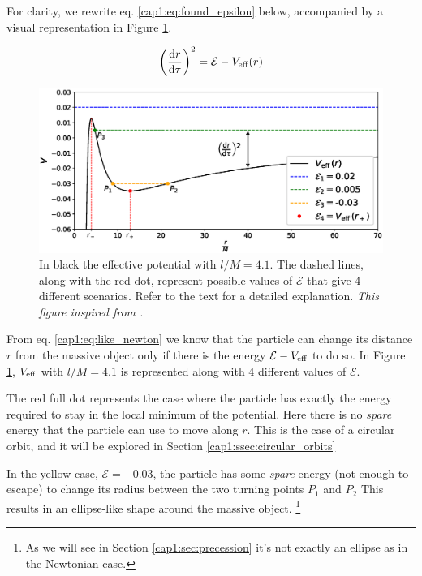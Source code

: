 For clarity, we rewrite eq. \ref{cap1:eq:found_epsilon} below, accompanied by a
visual representation in Figure \ref{cap1:fig:V_eff_orbits}.

\begin{equation}
    \left( \dv{r}{\tau} \right)^2 = \mathcal E - V_{\rm eff} (r)
    \label{cap1:eq:like_newton}
\end{equation}

\begin{figure}[h]
    \centering
    \includegraphics[width = \textwidth]{Figures/V_eff_orbits.eps}
    \caption{In black the effective potential with $l / M = 4.1$.
    The dashed lines, along with the red dot, represent possible values of
    $\mathcal E$ that give 4 different scenarios.
    Refer to the text for a detailed explanation. 
    \textit{This figure inspired from
    \cite[page 245, Figure 12.2]{shapiro2008black}.}}
    \label{cap1:fig:V_eff_orbits}
\end{figure}

From eq. \ref{cap1:eq:like_newton} we know that the particle can change its
distance $r$ from the massive object only if there is the energy
$\mathcal E - V_{\rm eff}$ to do so.
In Figure \ref{cap1:fig:V_eff_orbits}, $V_{\rm eff}$ with $l / M = 4.1$ is
represented along with 4 different values of $\mathcal E$.

The red full dot represents the case where the particle has exactly the energy
required to stay in the local minimum of the potential.
Here there is no \textit{spare} energy that the particle can use to move along
$r$.
This is the case of a circular orbit, and it will be explored in Section
\ref{cap1:ssec:circular_orbits}

In the yellow case, $\mathcal E = -0.03$, the particle has some \textit{spare}
energy (not enough to escape) to change its radius between the two turning
points $P_1$ and $P_2$
This results in an ellipse-like shape around the massive object.
\footnote{As we will see in Section \ref{cap1:sec:precession} it's not
exactly an ellipse as in the Newtonian case.}

